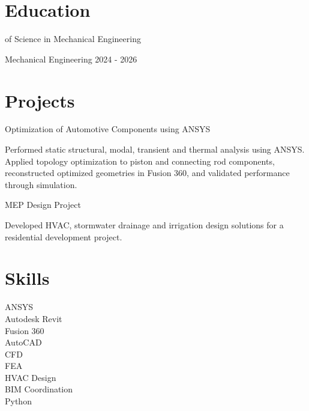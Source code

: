 \documentclass[11pt]{article}
\begin{document}
\section*{Education}



\textbfMaster of Science in Mechanical Engineering

Mechanical Engineering \hfill 2024 - 2026




\section*{Projects}



\textbfTopology Optimization of Automotive Components using ANSYS

Performed static structural, modal, transient and thermal analysis using ANSYS. Applied topology optimization to piston and connecting rod components, reconstructed optimized geometries in Fusion 360, and validated performance through simulation.




\textbfResidential MEP Design Project

Developed HVAC, stormwater drainage and irrigation design solutions for a residential development project.





\section*{Skills}


ANSYS \\

Autodesk Revit \\

Fusion 360 \\

AutoCAD \\

CFD \\

FEA \\

HVAC Design \\

BIM Coordination \\

Python \\
\end{document}
